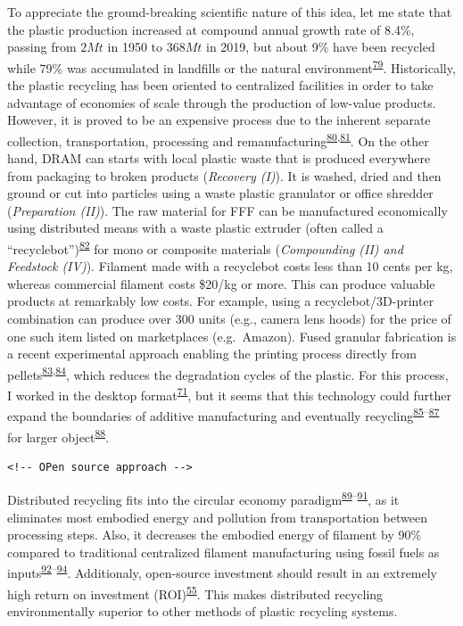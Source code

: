 \documentclass[
  11pt,
  a4paperpaper,
  onecolumn]{article}
\begin{document}
To appreciate the ground-breaking scientific nature of this idea, let me
state that the plastic production increased at compound annual growth
rate of 8.4\%, passing from \(2Mt\) in 1950 to \(368Mt\) in 2019, but
about 9\% have been recycled while 79\% was accumulated in landfills or
the natural
environment\textsuperscript{\protect\hyperlink{ref-Geyer2017}{79}}.
Historically, the plastic recycling has been oriented to centralized
facilities in order to take advantage of economies of scale through the
production of low-value products. However, it is proved to be an
expensive process due to the inherent separate collection,
transportation, processing and
remanufacturing\textsuperscript{\protect\hyperlink{ref-Hopewell2009}{80},\protect\hyperlink{ref-Singh2017b}{81}}.
On the other hand, DRAM can starts with local plastic waste that is
produced everywhere from packaging to broken products (\emph{Recovery
(I)}). It is washed, dried and then ground or cut into particles using a
waste plastic granulator or office shredder (\emph{Preparation (II)}).
The raw material for FFF can be manufactured economically using
distributed means with a waste plastic extruder (often called a
``recyclebot'')\textsuperscript{\protect\hyperlink{ref-Baechler2013}{82}}
for mono or composite materials (\emph{Compounding (II) and Feedstock
(IV)}). Filament made with a recyclebot costs less than 10 cents per kg,
whereas commercial filament costs \$20/kg or more. This can produce
valuable products at remarkably low costs. For example, using a
recyclebot/3D-printer combination can produce over 300 units (e.g.,
camera lens hoods) for the price of one such item listed on marketplaces
(e.g.~Amazon). Fused granular fabrication is a recent experimental
approach enabling the printing process directly from
pellets\textsuperscript{\protect\hyperlink{ref-JustinoNetto2021}{83},\protect\hyperlink{ref-netto2022}{84}},
which reduces the degradation cycles of the plastic. For this process, I
worked in the desktop
format\textsuperscript{\protect\hyperlink{ref-Arthur2020}{71}}, but it
seems that this technology could further expand the boundaries of
additive manufacturing and eventually
recycling\textsuperscript{\protect\hyperlink{ref-billah2021}{85}--\protect\hyperlink{ref-Byard2019}{87}}
for larger
object\textsuperscript{\protect\hyperlink{ref-petsiuk2022}{88}}.

\begin{verbatim}
<!-- OPen source approach -->
\end{verbatim}

Distributed recycling fits into the circular economy
paradigm\textsuperscript{\protect\hyperlink{ref-Zhong2018}{89}--\protect\hyperlink{ref-Despeisse2016}{91}},
as it eliminates most embodied energy and pollution from transportation
between processing steps. Also, it decreases the embodied energy of
filament by 90\% compared to traditional centralized filament
manufacturing using fossil fuels as
inputs\textsuperscript{\protect\hyperlink{ref-Kreiger2013}{92}--\protect\hyperlink{ref-Horta2017}{94}}.
Additionaly, open-source investment should result in an extremely high
return on investment
(ROI)\textsuperscript{\protect\hyperlink{ref-Pearce2020a}{55}}. This
makes distributed recycling environmentally superior to other methods of
plastic recycling systems.
\end{document}
